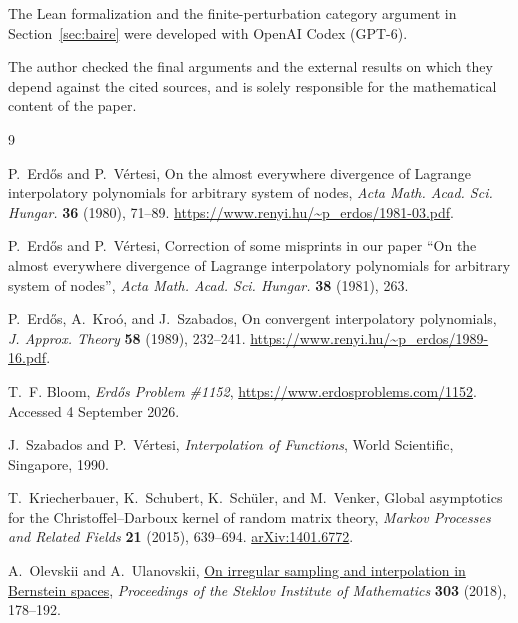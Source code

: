 \documentclass[11pt]{article}
\theoremstyle{definition}
\numberwithin{equation}{section}
\begin{document}
The Lean formalization and the finite-perturbation category argument in
Section~\ref{sec:baire} were developed with OpenAI Codex (GPT-6).

The author checked the final arguments and the external results on which
they depend against the cited sources, and is solely responsible for the
mathematical content of the paper.

\begin{thebibliography}{9}

P.~Erd\H{o}s and P.~V\'ertesi,
On the almost everywhere divergence of Lagrange interpolatory polynomials
for arbitrary system of nodes,
\emph{Acta Math. Acad. Sci. Hungar.} \textbf{36} (1980), 71--89.
\url{https://www.renyi.hu/~p_erdos/1981-03.pdf}.

P.~Erd\H{o}s and P.~V\'ertesi,
Correction of some misprints in our paper ``On the almost everywhere
divergence of Lagrange interpolatory polynomials for arbitrary system of
nodes'',
\emph{Acta Math. Acad. Sci. Hungar.} \textbf{38} (1981), 263.

P.~Erd\H{o}s, A.~Kro\'o, and J.~Szabados,
On convergent interpolatory polynomials,
\emph{J. Approx. Theory} \textbf{58} (1989), 232--241.
\url{https://www.renyi.hu/~p_erdos/1989-16.pdf}.

T.~F. Bloom,
\emph{Erd\H{o}s Problem \#1152},
\url{https://www.erdosproblems.com/1152}.
Accessed 4 September 2026.

J.~Szabados and P.~V\'ertesi,
\emph{Interpolation of Functions},
World Scientific, Singapore, 1990.

T.~Kriecherbauer, K.~Schubert, K.~Sch\"uler, and M.~Venker,
Global asymptotics for the Christoffel--Darboux kernel of random
matrix theory,
\emph{Markov Processes and Related Fields} \textbf{21} (2015),
639--694.
\href{https://arxiv.org/abs/1401.6772}{arXiv:1401.6772}.

A.~Olevskii and A.~Ulanovskii,
\href{https://doi.org/10.1134/S0081543818080151}
{On irregular sampling and interpolation in Bernstein spaces},
\emph{Proceedings of the Steklov Institute of Mathematics}
\textbf{303} (2018), 178--192.

\end{thebibliography}
\end{document}
